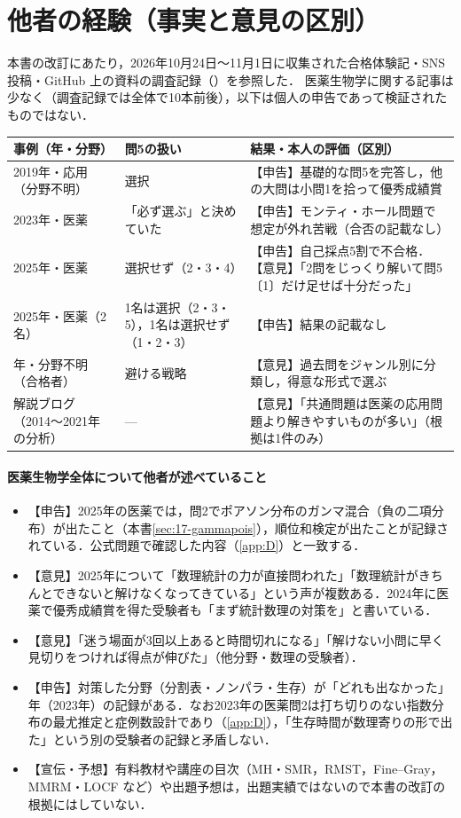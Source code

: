 \documentclass[a4paper,11pt,openany]{ltjsbook}
\begin{document}
\section{他者の経験（事実と意見の区別）}\label{sec:G-cases}
本書の改訂にあたり，2026年10月24日〜11月1日に収集された合格体験記・SNS 投稿・GitHub 上の資料の調査記録（\cite{web:others}）を参照した．
医薬生物学に関する記事は少なく（調査記録では全体で10本前後），以下は個人の申告であって検証されたものではない．
\begin{center}\small
\begin{tabular}{@{}L{32mm}L{40mm}L{66mm}@{}}
\toprule
事例（年・分野） & 問5の扱い & 結果・本人の評価（区別）\\
\midrule
2019年・応用（分野不明） & 選択 & 【申告】基礎的な問5を完答し，他の大問は小問1を拾って優秀成績賞\\
2023年・医薬 & 「必ず選ぶ」と決めていた & 【申告】モンティ・ホール問題で想定が外れ苦戦（合否の記載なし）\\
2025年・医薬 & 選択せず（2・3・4） & 【申告】自己採点5割で不合格．【意見】「2問をじっくり解いて問5〔1〕だけ足せば十分だった」\\
2025年・医薬（2名） & 1名は選択（2・3・5），1名は選択せず（1・2・3） & 【申告】結果の記載なし\\
年・分野不明（合格者） & 避ける戦略 & 【意見】過去問をジャンル別に分類し，得意な形式で選ぶ\\
解説ブログ（2014〜2021年の分析） & --- & 【意見】「共通問題は医薬の応用問題より解きやすいものが多い」（根拠は1件のみ）\\
\bottomrule
\end{tabular}
\end{center}
\paragraph{医薬生物学全体について他者が述べていること}
\begin{itemize}
\item 【申告】2025年の医薬では，問2でポアソン分布のガンマ混合（負の二項分布）が出たこと（本書\cref{sec:17-gammapois}），順位和検定が出たことが記録されている．公式問題で確認した内容（\cref{app:D}）と一致する．
\item 【意見】2025年について「数理統計の力が直接問われた」「数理統計がきちんとできないと解けなくなってきている」という声が複数ある．2024年に医薬で優秀成績賞を得た受験者も「まず統計数理の対策を」と書いている．
\item 【意見】「迷う場面が3回以上あると時間切れになる」「解けない小問に早く見切りをつければ得点が伸びた」（他分野・数理の受験者）．
\item 【申告】対策した分野（分割表・ノンパラ・生存）が「どれも出なかった」年（2023年）の記録がある．なお2023年の医薬問2は打ち切りのない指数分布の最尤推定と症例数設計であり（\cref{app:D}），「生存時間が数理寄りの形で出た」という別の受験者の記録と矛盾しない．
\item 【宣伝・予想】有料教材や講座の目次（MH・SMR，RMST，Fine--Gray，MMRM・LOCF など）や出題予想は，出題実績ではないので本書の改訂の根拠にはしていない．
\end{itemize}
\end{document}
